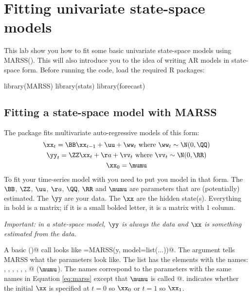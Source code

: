 

\setcounter{MaxMatrixCols}{20}
\usepackage{enumerate}
\usepackage{Sweave}





\chapter{Fitting univariate state-space models}
\label{chap:univariate state-space}


This lab show you how to fit some basic univariate state-space models using MARSS(). This will also introduce you to the idea of writing AR models in state-space form.  Before running the code, load the required R packages:
\begin{Schunk}
\begin{Sinput}
 library(MARSS)
 library(stats)
 library(forecast)
\end{Sinput}
\end{Schunk}


\section{Fitting a state-space model with MARSS}
The \verb@MARSS@ package fits multivariate auto-regressive models of this form:
\begin{equation}
\begin{gathered}
\xx_t = \BB \xx_{t-1}+\uu+\ww_t \text{ where } \ww_t \sim \N(0,\QQ) \\
\yy_t = \ZZ\xx_t+\aa+\vv_t \text{ where } \vv_t \sim \N(0,\RR) \\
\xx_0 = \mumu
\end{gathered}   
\label{eq:marss}
\end{equation}
To fit your time-series model with \verb@MARSS@ you need to put you model in that form.  The $\BB$, $\ZZ$, $\uu$, $\aa$, $\QQ$, $\RR$ and $\mumu$ are parameters that are (potentially) estimated. The $\yy$ are your data.  The $\xx$ are the hidden state(s).  Everything in bold is a matrix; if it is a small bolded letter, it is a matrix with 1 column.

{\it Important: in a state-space model, $\yy$ is always the data and $\xx$ is something estimated from the data.}

A basic \verb@MARSS()@ call looks like
\verb@fit=MARSS(y, model=list(...))@.
The \verb@model@ argument tells MARSS what the parameters look like.  The list has the elements with the names: \verb@B@, \verb@U@, \verb@Q@, \verb@Z@, \verb@A@, \verb@R@, @ ($\mumu$).  The names correspond to the parameters with the same names in Equation \ref{eq:marss} except that $\mumu$ is called @. \verb@tinitx@ indicates whether the initial $\xx$ is specified at $t=0$ so $\xx_0$ or $t=1$ so $\xx_1$.

